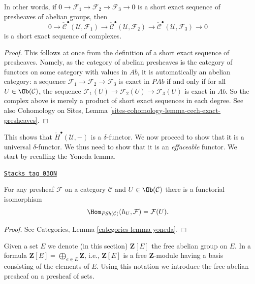 In other words, if $0\to \mathcal{F}_1\to \mathcal{F}_2\to \mathcal{F}_3\to 0$
is a short exact sequence of presheaves of abelian groups, then
$$
0 \to \check{\mathcal{C}}^\bullet\left(\mathcal{U}, \mathcal{F}_1\right)
\to\check{\mathcal{C}}^\bullet(\mathcal{U}, \mathcal{F}_2) \to
\check{\mathcal{C}}^\bullet(\mathcal{U}, \mathcal{F}_3)\to 0
$$
is a short exact sequence of complexes.

\begin{proof}
This follows at once from the definition of a short exact sequence of
presheaves. Namely, as the category of abelian presheaves is the category of
functors on some category with values in $\textit{Ab}$, it is automatically an
abelian category: a sequence $\mathcal{F}_1\to \mathcal{F}_2\to \mathcal{F}_3$
is exact in $\textit{PAb}$ if and only if for all
$U \in \Ob(\mathcal{C})$, the sequence
$\mathcal{F}_1(U) \to \mathcal{F}_2(U) \to \mathcal{F}_3(U)$ is exact in
$\textit{Ab}$. So the complex above is merely a product of short exact
sequences in each degree. See also
Cohomology on Sites, Lemma \ref{sites-cohomology-lemma-cech-exact-presheaves}.
\end{proof}

This shows that $\check{H}^\bullet(\mathcal{U}, -)$ is a $\delta$-functor.
We now proceed to show that it is a universal $\delta$-functor. We thus need to
show that it is an {\it effaceable} functor. We start by recalling the Yoneda
lemma.

\begin{lemma}

\label{etale-cohomology-lemma-yoneda-presheaf}
\href{https://stacks.math.columbia.edu/tag/03ON}{\texttt{Stacks tag 03ON}}

For any presheaf $\mathcal{F}$ on a category $\mathcal{C}$
and $U \in \Ob(\mathcal{C})$ there is a functorial isomorphism
$$
\Hom_{\textit{PSh}(\mathcal{C})}(h_U, \mathcal{F}) =
\mathcal{F}(U).
$$
\end{lemma}

\begin{proof}
See Categories, Lemma \ref{categories-lemma-yoneda}.
\end{proof}

Given a set $E$ we denote (in this section)
$\mathbf{Z}[E]$ the free abelian group on $E$. In a formula
$\mathbf{Z}[E] = \bigoplus_{e \in E} \mathbf{Z}$, i.e., $\mathbf{Z}[E]$ is
a free $\mathbf{Z}$-module having a basis consisting of the elements of $E$.
Using this notation we introduce the free abelian presheaf on a
presheaf of sets.

